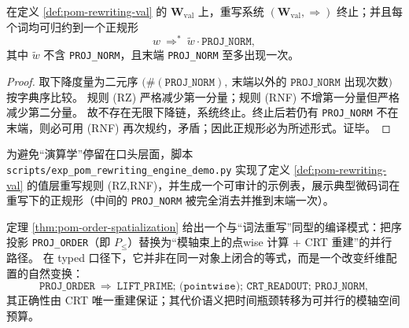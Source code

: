 \begin{proposition}[终止性与正规形存在（值层）]\label{prop:pom-rewriting-terminating}
在定义 \ref{def:pom-rewriting-val} 的 \(\mathbf{W}_{\mathrm{val}}\) 上，重写系统 \((\mathbf{W}_{\mathrm{val}},\Rightarrow)\) 终止；并且每个词均可归约到一个正规形
\[
w\ \Rightarrow^\ast\ \widetilde w\cdot \texttt{PROJ\_NORM},
\]
其中 \(\widetilde w\) 不含 \texttt{PROJ\_NORM}，且末端 \texttt{PROJ\_NORM} 至多出现一次。
\end{proposition}
\begin{proof}
取下降度量为二元序
\(
\big(\#(\texttt{PROJ\_NORM}),\ \text{末端以外的 }\texttt{PROJ\_NORM}\text{ 出现次数}\big)
\)
按字典序比较。
规则 (RZ) 严格减少第一分量；规则 (RNF) 不增第一分量但严格减少第二分量。
故不存在无限下降链，系统终止。终止后若仍有 \texttt{PROJ\_NORM} 不在末端，则必可用 (RNF) 再次规约，矛盾；因此正规形必为所述形式。证毕。
\end{proof}



\begin{remark}\label{rem:pom-rewriting-engine-demo}
为避免“演算学”停留在口头层面，脚本 \texttt{scripts/exp\_pom\_rewriting\_engine\_demo.py} 实现了定义 \ref{def:pom-rewriting-val} 的值层重写规则 (RZ,RNF)，并生成一个可审计的示例表，展示典型微码词在重写下的正规形（中间的 \texttt{PROJ\_NORM} 被完全消去并推到末端一次）。

\end{remark}

\begin{remark}[序投影的空间化作为编译重写模式]\label{rem:pom-rewriting-order-spatialize}
定理 \ref{thm:pom-order-spatialization} 给出一个与“词法重写”同型的编译模式：把序投影 \texttt{PROJ\_ORDER}（即 \(P_{\le}\)）替换为“模轴束上的点wise 计算 + CRT 重建”的并行路径。
在 typed 口径下，它并非在同一对象上闭合的等式，而是一个改变纤维配置的自然变换：
\[
\texttt{PROJ\_ORDER}
\ \Longrightarrow\
\texttt{LIFT\_PRIME; (pointwise);\ CRT\_READOUT; PROJ\_NORM},
\]
其正确性由 CRT 唯一重建保证；其代价语义把时间瓶颈转移为可并行的模轴空间预算。
\end{remark}

